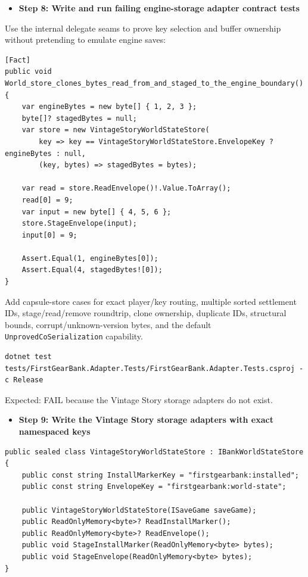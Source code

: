 \documentclass[
  10pt,
  letterpaper,
]{article}
\newcommand{\passthrough}[1]{#1}
\providecommand{\tightlist}{%
  \setlength{\itemsep}{0pt}\setlength{\parskip}{0pt}}
\begin{document}
\begin{itemize}
\tightlist
\item[$\square$]
  \textbf{Step 8: Write and run failing engine-storage adapter contract
  tests}
\end{itemize}

Use the internal delegate seams to prove key selection and buffer
ownership without pretending to emulate engine saves:

\begin{lstlisting}
[Fact]
public void World_store_clones_bytes_read_from_and_staged_to_the_engine_boundary()
{
    var engineBytes = new byte[] { 1, 2, 3 };
    byte[]? stagedBytes = null;
    var store = new VintageStoryWorldStateStore(
        key => key == VintageStoryWorldStateStore.EnvelopeKey ? engineBytes : null,
        (key, bytes) => stagedBytes = bytes);

    var read = store.ReadEnvelope()!.Value.ToArray();
    read[0] = 9;
    var input = new byte[] { 4, 5, 6 };
    store.StageEnvelope(input);
    input[0] = 9;

    Assert.Equal(1, engineBytes[0]);
    Assert.Equal(4, stagedBytes![0]);
}
\end{lstlisting}

Add capsule-store cases for exact player/key routing, multiple sorted
settlement IDs, stage/\allowbreak{}read/\allowbreak{}remove roundtrip,
clone ownership, duplicate IDs, structural bounds,
corrupt/unknown-version bytes, and the default
\passthrough{\lstinline!UnprovedCoSerialization!} capability.

\begin{lstlisting}
dotnet test tests/FirstGearBank.Adapter.Tests/FirstGearBank.Adapter.Tests.csproj -c Release
\end{lstlisting}

Expected: FAIL because the Vintage Story storage adapters do not exist.

\begin{itemize}
\tightlist
\item[$\square$]
  \textbf{Step 9: Write the Vintage Story storage adapters with exact
  namespaced keys}
\end{itemize}

\begin{lstlisting}
public sealed class VintageStoryWorldStateStore : IBankWorldStateStore
{
    public const string InstallMarkerKey = "firstgearbank:installed";
    public const string EnvelopeKey = "firstgearbank:world-state";

    public VintageStoryWorldStateStore(ISaveGame saveGame);
    public ReadOnlyMemory<byte>? ReadInstallMarker();
    public ReadOnlyMemory<byte>? ReadEnvelope();
    public void StageInstallMarker(ReadOnlyMemory<byte> bytes);
    public void StageEnvelope(ReadOnlyMemory<byte> bytes);
}
\end{lstlisting}
\end{document}
